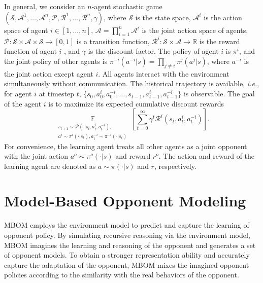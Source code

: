 \documentclass{article}
\begin{document}
In general, we consider an $n$-agent stochastic game $(\mathcal{S},\mathcal{A}^1, \dots, \mathcal{A}^n,\mathcal{P},\mathcal{R}^1,\dots,\mathcal{R}^n,\gamma)$, where $\mathcal{S}$ is the state space, $\mathcal{A}^i$ is the action space of agent $i \in [1,\dots,n]$, $\mathcal{A}=\prod_{i=1}^n\mathcal{A}^i$ is the joint action space of agents, $\mathcal{P}:\mathcal{S} \times \mathcal{A} \times \mathcal{S} \to [0, 1]$ is a transition function, $\mathcal{R}^i: \mathcal{S} \times \mathcal{A} \to \mathbb{R}$ is the reward function of agent $i$ , and $\gamma$ is the discount factor. The policy of agent $i$ is $\pi^i$, and the joint policy of other agents is $\pi^{-i}(a^{-i}|s) = \prod_{j \neq i}\pi^j(a^j|s)$, where $a^{-i}$ is the joint action except agent $i$.
All agents interact with the environment simultaneously without communication. The historical trajectory is available, \emph{i.e.}, for agent $i$ at timestep $t$, $\{s_0, a_0^i, a_0^{-i}, \dots, s_{t-1}, a_{t-1}^i, a_{t-1}^{-i}\}$ is observable. The goal of the agent $i$ is to maximize its expected cumulative discount rewards
\begin{equation}
	\label{eq_agent_goal}
	\mathop{\mathbb{E}}\limits_{\substack{s_{t+1}\sim\mathcal{P}(\cdot|s_t, a_t^i, a_t^{-i}), \\a^i\sim\pi^i(\cdot |s_t), a_t^{-i}\sim\pi^{-i}(\cdot |s_t)}}\left [ \sum_{t=0}^{\infty}\gamma^t\mathcal{R}^i(s_t,a_t^i,a_t^{-i})  \right ].
\end{equation}
For convenience, the learning agent treats all other agents as a joint opponent with the joint action $a^o \sim \pi^o(\cdot|s)$ and reward $r^o$. The action and reward of the learning agent are denoted as $a \sim \pi(\cdot|s)$ and $r$, respectively.




\section{Model-Based Opponent Modeling}
\label{method}
MBOM employs the environment model to predict and capture the learning of opponent policy. By simulating recursive reasoning via the environment model, MBOM imagines the learning and reasoning of the opponent and generates a set of opponent models. To obtain a stronger representation ability and accurately capture the adaptation of the opponent, MBOM mixes the imagined opponent policies according to the similarity with the real behaviors of the opponent.
\end{document}
